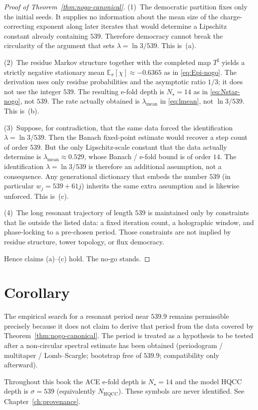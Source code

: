 \begin{proof}[Proof of Theorem~\ref{thm:nogo-canonical}]
(1)~The democratic partition fixes only the initial seeds. It supplies no
information about the mean size of the charge-correcting exponent along later
iterates that would determine a Lipschitz constant already containing \(539\).
Therefore democracy cannot break the circularity of the argument that sets
\(\lambda=\ln 3/539\). This is~(a).

(2)~The residue Markov structure together with the completed map \(T^\sharp\)
yields a strictly negative stationary mean \(\mathbb{E}_\pi[\chi]\approx -0.6365\)
as in \eqref{eq:Epi-nogo}. The derivation uses only residue probabilities and
the asymptotic ratio \(1/3\); it does not use the integer \(539\). The resulting
e-fold depth is \(N_\star=14\) as in \eqref{eq:Nstar-nogo}, not \(539\). The rate
actually obtained is \(\lambda_{\mathrm{mean}}\) in \eqref{eq:lmean}, not
\(\ln 3/539\). This is~(b).

(3)~Suppose, for contradiction, that the same data forced the identification
\(\lambda=\ln 3/539\). Then the Banach fixed-point estimate would recover a step
count of order \(539\). But the only Lipschitz-scale constant that the data
actually determine is \(\lambda_{\mathrm{mean}}\approx 0.529\), whose Banach /
e-fold bound is of order \(14\). The identification \(\lambda=\ln 3/539\) is
therefore an additional assumption, not a consequence. Any generational
dictionary that embeds the number \(539\) (in particular \(w_j=539+61j\))
inherits the same extra assumption and is likewise unforced. This is~(c).

(4)~The long resonant trajectory of length \(539\) is maintained only by
constraints that lie outside the listed data: a fixed iteration count, a
holographic window, and phase-locking to a pre-chosen period. Those constraints
are not implied by residue structure, tower topology, or flux democracy.

Hence claims (a)--(c) hold. The no-go stands.
\end{proof}

\section{Corollary}

\begin{corollary}
\label{cor:emp-nogo}
The empirical search for a resonant period near \(539.9\) remains permissible
precisely because it does not claim to derive that period from the data covered
by Theorem~\ref{thm:nogo-canonical}. The period is treated as a hypothesis to be
tested after a non-circular spectral estimate has been obtained
(periodogram / multitaper / Lomb--Scargle; bootstrap free of \(539.9\);
compatibility only afterward).
\end{corollary}

\begin{remark}
\label{rem:depth-split-nogo}
Throughout this book the ACE e-fold depth is \(N_\star=14\) and the model HQCC
depth is \(\sigma=539\) (equivalently \(N_{\mathrm{HQCC}}\)). These symbols are
never identified. See Chapter~\ref{ch:provenance}.
\end{remark}

